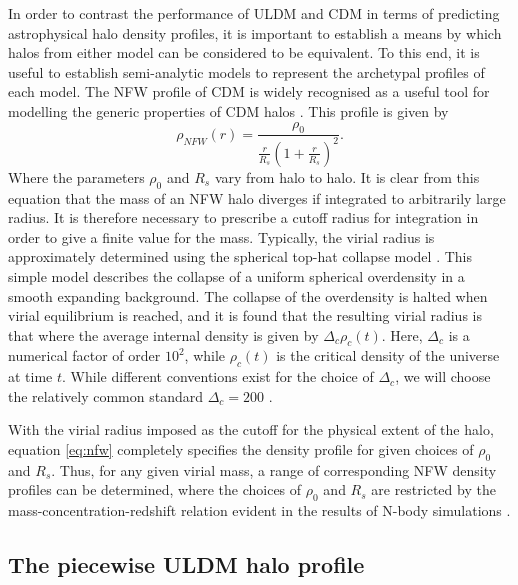 \documentclass[a4paper,11pt]{article}
\begin{document}
In order to contrast the performance of ULDM and CDM in terms of predicting astrophysical halo density profiles, it is important to establish a means by which halos from either model can be considered to be equivalent. To this end, it is useful to establish semi-analytic models to represent the archetypal profiles of each model. The NFW profile of CDM is widely recognised as a useful tool for modelling the generic properties of CDM halos \cite{Navarro:1995iw, Maccio:2008pcd}. This profile is given by
\begin{equation}\label{eq:nfw}
    \rho_{NFW}(r)=\frac{\rho_0}{\frac{r}{R_s}\left(1+\frac{r}{R_s}\right)^2}.
\end{equation}
Where the parameters $\rho_0$ and $R_s$ vary from halo to halo. It is clear from this equation that the mass of an NFW halo diverges if integrated to arbitrarily large radius. It is therefore necessary to prescribe a cutoff radius for integration in order to give a finite value for the mass. Typically, the virial radius is approximately determined using the spherical top-hat collapse model \cite{White:2000jv, Suto:2015jdt, Herrera:2017epn}. This simple model describes the collapse of a uniform spherical overdensity in a smooth expanding background. The collapse of the overdensity is halted when virial equilibrium is reached, and it is found that the resulting virial radius is that where the average internal density is given by $\Delta_c \rho_c(t)$. Here, $\Delta_c$ is a numerical factor of order $10^2$, while $\rho_c(t)$ is the critical density of the universe at time $t$. While different conventions exist for the choice of $\Delta_c$, we will choose the relatively common standard $\Delta_c = 200$ \cite{Richings:2018}. 

With the virial radius imposed as the cutoff for the physical extent of the halo, equation \ref{eq:nfw} completely specifies the density profile for given choices of $\rho_0$ and $R_s$. Thus, for any given virial mass, a range of corresponding NFW density profiles can be determined, where the choices of $\rho_0$ and $R_s$ are restricted by the mass-concentration-redshift relation evident in the results of N-body simulations \cite{Ludlow:2013vxa}. 

\subsection{The piecewise ULDM halo profile}
\end{document}
